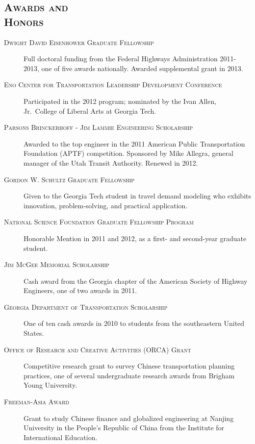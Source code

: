 \documentclass[margin,line]{res}
\newcommand{\secfont}{\scshape }
\newcommand{\acc}{\scshape }
\begin{document}
\begin{resume}
\noindent\makebox[\linewidth]{\rule{\linewidth}{0.4pt}}
\section{\secfont Awards and\\ Honors}
\begin{description}
\item[\acc Dwight David Eisenhower Graduate Fellowship] Full doctoral funding from
the Federal Highways Administration 2011-2013, one of five awards nationally.
Awarded supplemental grant in 2013.
\item[\acc Eno Center for Transportation Leadership Development Conference]
Participated in the 2012 program; nominated by the Ivan Allen, Jr.\ College of
Liberal Arts at Georgia Tech.
\item[\acc Parsons Brinckerhoff - Jim Lammie Engineering Scholarship] Awarded
 to the top engineer in the 2011 American Public Transportation Foundation (APTF)
competition. Sponsored by Mike Allegra, general manager of the Utah Transit
Authority. Renewed in 2012.
\item[\acc Gordon W. Schultz Graduate Fellowship] Given to the Georgia Tech
student in travel demand modeling who exhibits innovation, problem-solving, and
practical application.
\item[\acc National Science Foundation Graduate Fellowship Program] Honorable
Mention in 2011 and 2012, as a first- and second-year graduate student.
\item[\acc Jim McGee Memorial Scholarship] Cash award from the Georgia chapter of the
American Society of Highway Engineers, one of two awards in 2011.
\item[\acc Georgia Department of Transportation Scholarship] One of ten cash awards in
2010 to students from the southeastern United States.
\item[\acc Office of Research and Creative Activities (ORCA) Grant] Competitive
research grant to survey Chinese transportation planning practices, one of
several undergraduate research awards from Brigham Young University.
\item[\acc Freeman-Asia Award] Grant to study Chinese finance and globalized
engineering at Nanjing University in the People's Republic of China from the
Institute for International Education.
\end{description}


\end{resume}
\end{document}
